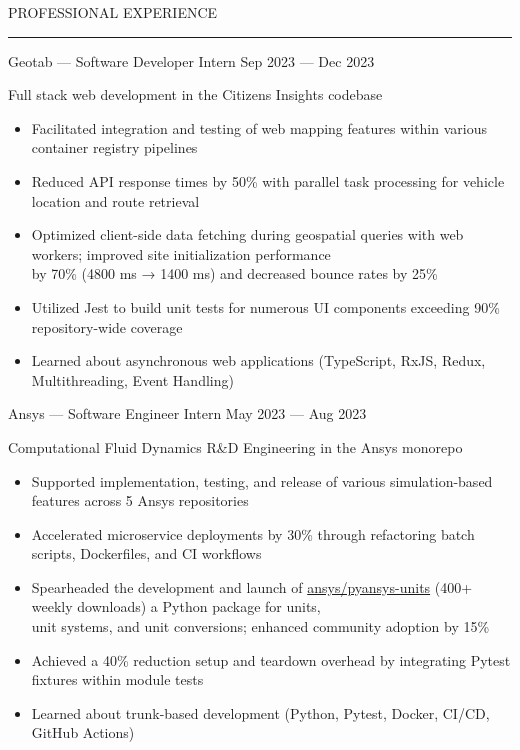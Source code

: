 \documentclass[9pt]{extarticle}
\begin{document}
\begin{adjustwidth}{4pt}{4pt} PROFESSIONAL EXPERIENCE \end{adjustwidth}
\rule[8pt]{\linewidth}{0.4pt}

\begin{adjustwidth}{14pt}{14pt}
	Geotab — Software Developer Intern \hfill Sep 2023 — Dec 2023
	
	Full stack web development in the Citizens Insights codebase
	
	\begin{itemize}
	  	\item Facilitated integration and testing of web mapping features within various container registry pipelines
		\item Reduced API response times by 50\% with parallel task processing for vehicle location and route retrieval
		\item Optimized client-side data fetching during geospatial queries with web workers; improved site initialization performance \\
			by 70\% (4800 ms → 1400 ms) and decreased bounce rates by 25\% 
		\item Utilized Jest to build unit tests for numerous UI components exceeding 90\% repository-wide coverage
		\item Learned about asynchronous web applications (TypeScript, RxJS, Redux, Multithreading, Event Handling)
	\end{itemize}
	
	Ansys — Software Engineer Intern \hfill May 2023 — Aug 2023
	
	Computational Fluid Dynamics R\&D Engineering in the Ansys monorepo
	
	\begin{itemize}
		\item Supported implementation, testing, and release of various simulation-based features across 5 Ansys repositories
		\item Accelerated microservice deployments by 30\% through refactoring batch scripts, Dockerfiles, and CI workflows
		\item Spearheaded the development and launch of \href{https://github.com/ansys/pyansys-units}{ansys/pyansys-units} (400+ weekly downloads) a Python package for units, \\
			unit systems, and unit conversions; enhanced community adoption by 15\%
		\item Achieved a 40\% reduction setup and teardown overhead by integrating Pytest fixtures within module tests
		\item Learned about trunk-based development (Python, Pytest, Docker, CI/CD, GitHub Actions)
	\end{itemize}
\end{adjustwidth}
\end{document}
